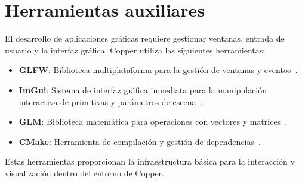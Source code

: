 \section{Herramientas auxiliares}

El desarrollo de aplicaciones gráficas requiere gestionar ventanas, entrada de
usuario y la interfaz gráfica. Copper utiliza las siguientes herramientas:

\begin{itemize}
    \item \textbf{GLFW}: Biblioteca multiplataforma para la gestión de ventanas y eventos~\cite{glfw-docs}.
    \item \textbf{ImGui}: Sistema de interfaz gráfica inmediata para la manipulación interactiva de primitivas y parámetros de escena~\cite{imgui-docs}.
    \item \textbf{GLM}: Biblioteca matemática para operaciones con vectores y matrices~\cite{glm-docs}.
    \item \textbf{CMake}: Herramienta de compilación y gestión de dependencias~\cite{cmake-docs}.
\end{itemize}

Estas herramientas proporcionan la infraestructura básica para la interacción y
visualización dentro del entorno de Copper.